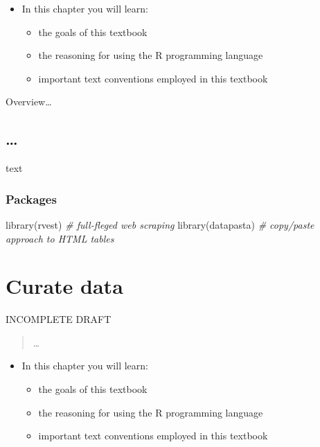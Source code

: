 \documentclass[
]{article}
\newenvironment{Shaded}{\begin{snugshade}}{\end{snugshade}}
\newcommand{\CommentTok}[1]{\textcolor[rgb]{0.56,0.35,0.01}{\textit{#1}}}
\newcommand{\FunctionTok}[1]{\textcolor[rgb]{0.00,0.00,0.00}{#1}}
\newcommand{\NormalTok}[1]{#1}
\providecommand{\tightlist}{%
  \setlength{\itemsep}{0pt}\setlength{\parskip}{0pt}}
\newenvironment{rmdblock}[1]
  {\begin{shaded*}
  \begin{itemize}
  \renewcommand{\labelitemi}{
    \raisebox{-.5\height}[0pt][0pt]{
      {\setkeys{Gin}{width=2em,keepaspectratio}\texttt{[image: assets/images/\#1]}}
    }
  }
  \item
  }
  {
  \end{itemize}
  \end{shaded*}
  }
\newenvironment{rmdkey}
  {\begin{rmdblock}{key}}
  {\end{rmdblock}}
\begin{document}
\begin{rmdkey}
In this chapter you will learn:

\begin{itemize}
\tightlist
\item
  the goals of this textbook
\item
  the reasoning for using the R programming language
\item
  important text conventions employed in this textbook
\end{itemize}
\end{rmdkey}

Overview\ldots{}

\hypertarget{section}{%
\subsection{\ldots{}}\label{section}}

text

\hypertarget{acquire-data-packages}{%
\subsubsection{Packages}\label{acquire-data-packages}}

\begin{Shaded}
\begin{Highlighting}[]
\FunctionTok{library}\NormalTok{(rvest)  }\CommentTok{\# full{-}fleged web scraping}
\FunctionTok{library}\NormalTok{(datapasta)  }\CommentTok{\# copy/paste approach to HTML tables}
\end{Highlighting}
\end{Shaded}

\hypertarget{curate-data}{%
\section{Curate data}\label{curate-data}}

INCOMPLETE DRAFT

\begin{quote}
\ldots{}
\end{quote}

\begin{rmdkey}
In this chapter you will learn:

\begin{itemize}
\tightlist
\item
  the goals of this textbook
\item
  the reasoning for using the R programming language
\item
  important text conventions employed in this textbook
\end{itemize}
\end{rmdkey}
\end{document}
